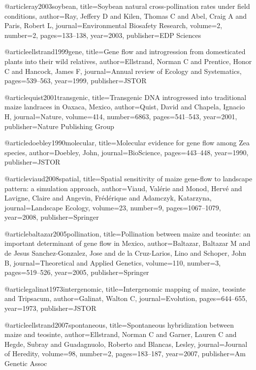 @article{ray2003soybean,
  title={Soybean natural cross-pollination rates under field conditions},
  author={Ray, Jeffery D and Kilen, Thomas C and Abel, Craig A and Paris, Robert L},
  journal={Environmental Biosafety Research},
  volume={2},
  number={2},
  pages={133--138},
  year={2003},
  publisher={EDP Sciences}
}

@article{ellstrand1999gene,
  title={Gene flow and introgression from domesticated plants into their wild relatives},
  author={Ellstrand, Norman C and Prentice, Honor C and Hancock, James F},
  journal={Annual review of Ecology and Systematics},
  pages={539--563},
  year={1999},
  publisher={JSTOR}
}

@article{quist2001transgenic,
  title={Transgenic DNA introgressed into traditional maize landraces in Oaxaca, Mexico},
  author={Quist, David and Chapela, Ignacio H},
  journal={Nature},
  volume={414},
  number={6863},
  pages={541--543},
  year={2001},
  publisher={Nature Publishing Group}
}

@article{doebley1990molecular,
  title={Molecular evidence for gene flow among Zea species},
  author={Doebley, John},
  journal={BioScience},
  pages={443--448},
  year={1990},
  publisher={JSTOR}
}

@article{viaud2008spatial,
  title={Spatial sensitivity of maize gene-flow to landscape pattern: a simulation approach},
  author={Viaud, Val{\'e}rie and Monod, Herv{\'e} and Lavigne, Claire and Angevin, Fr{\'e}d{\'e}rique and Adamczyk, Katarzyna},
  journal={Landscape Ecology},
  volume={23},
  number={9},
  pages={1067--1079},
  year={2008},
  publisher={Springer}
}

@article{baltazar2005pollination,
  title={Pollination between maize and teosinte: an important determinant of gene flow in Mexico},
  author={Baltazar, Baltazar M and de Jesus Sanchez-Gonzalez, Jose and de la Cruz-Larios, Lino and Schoper, John B},
  journal={Theoretical and Applied Genetics},
  volume={110},
  number={3},
  pages={519--526},
  year={2005},
  publisher={Springer}
}

@article{galinat1973intergenomic,
  title={Intergenomic mapping of maize, teosinte and Tripsacum},
  author={Galinat, Walton C},
  journal={Evolution},
  pages={644--655},
  year={1973},
  publisher={JSTOR}
}

@article{ellstrand2007spontaneous,
  title={Spontaneous hybridization between maize and teosinte},
  author={Ellstrand, Norman C and Garner, Lauren C and Hegde, Subray and Guadagnuolo, Roberto and Blancas, Lesley},
  journal={Journal of Heredity},
  volume={98},
  number={2},
  pages={183--187},
  year={2007},
  publisher={Am Genetic Assoc}
}

